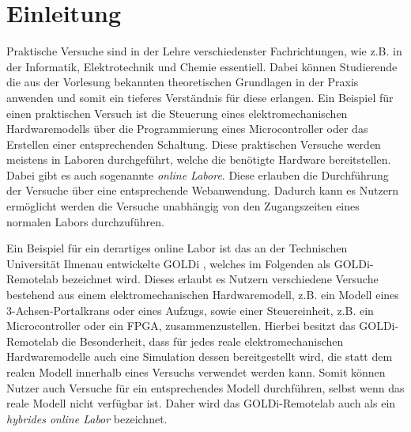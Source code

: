 \chapter{Einleitung}\label{section:einleitung}


Praktische Versuche sind in der Lehre verschiedenster Fachrichtungen, wie z.B. in der Informatik, Elektrotechnik und Chemie essentiell. Dabei können Studierende die aus der Vorlesung bekannten theoretischen Grundlagen in der Praxis anwenden und somit ein tieferes Verständnis für diese erlangen. Ein Beispiel für einen praktischen Versuch ist die Steuerung eines elektromechanischen Hardwaremodells über die Programmierung eines Microcontroller oder das Erstellen einer entsprechenden Schaltung. Diese praktischen Versuche werden meistens in Laboren durchgeführt, welche die benötigte Hardware bereitstellen. Dabei gibt es auch sogenannte \textit{online Labore}. Diese erlauben die Durchführung der Versuche über eine entsprechende Webanwendung. Dadurch kann es Nutzern ermöglicht werden die Versuche unabhängig von den Zugangszeiten eines normalen Labors durchzuführen.

Ein Beispiel für ein derartiges online Labor ist das an der Technischen Universität Ilmenau \cite{noauthor_tu-ilmenau_2025} entwickelte \ac{GOLDi} \cite{sitepoint_goldi_nodate}, welches im Folgenden als GOLDi-Remotelab bezeichnet wird. Dieses erlaubt es Nutzern verschiedene Versuche bestehend aus einem elektromechanischen Hardwaremodell, z.B. ein Modell eines 3-Achsen-Portalkrans oder eines Aufzugs, sowie einer Steuereinheit, z.B. ein Microcontroller oder ein \ac{FPGA}, zusammenzustellen. Hierbei besitzt das GOLDi-Remotelab die Besonderheit, dass für jedes reale elektromechanischen Hardwaremodelle auch eine Simulation dessen bereitgestellt wird, die statt dem realen Modell innerhalb eines Versuchs verwendet werden kann. Somit können Nutzer auch Versuche für ein entsprechendes Modell durchführen, selbst wenn das reale Modell nicht verfügbar ist. Daher wird das GOLDi-Remotelab auch als ein \textit{hybrides online Labor} bezeichnet.

